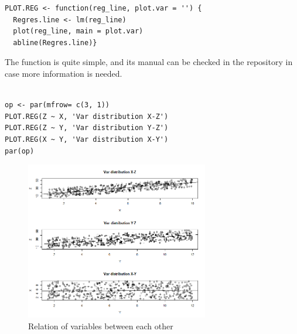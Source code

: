 \documentclass{article}
\begin{document}
\begin{lstlisting}
PLOT.REG <- function(reg_line, plot.var = '') {
  Regres.line <- lm(reg_line)
  plot(reg_line, main = plot.var)
  abline(Regres.line)}

\end{lstlisting}

The function is quite simple, and its manual can be checked in the repository in case more information is needed.\par

\begin{lstlisting}

op <- par(mfrow= c(3, 1))
PLOT.REG(Z ~ X, 'Var distribution X-Z')
PLOT.REG(Z ~ Y, 'Var distribution Y-Z')
PLOT.REG(X ~ Y, 'Var distribution X-Y')
par(op)

\end{lstlisting}

\begin{figure}[h]
\caption{Relation of variables between each other}
\includegraphics[width=8cm]{PLOT_CASE1.png}
\centering
\end{figure}
\newpage
\end{document}

